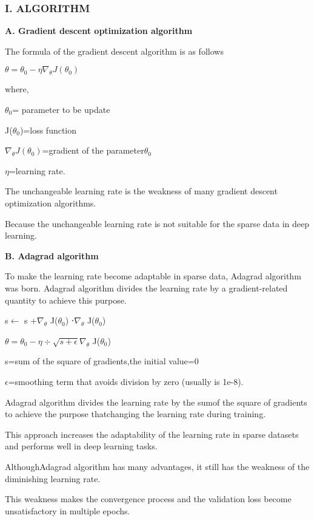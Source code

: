 \documentclass{beamer}
\begin{document}
\begin{frame}
\frametitle{I. ALGORITHM}

\textbf{A. Gradient descent optimization algorithm}

The formula of the gradient descent algorithm is as
follows 


$\theta=\theta_0-\eta \nabla_\theta J(\theta_0)$


where,


$ \theta_0 $= parameter to be update


J($\theta_0 $)=loss function 


$ \nabla_\theta J (\theta_0) $=gradient of the parameter$ \theta_0$


$\eta$=learning rate.


The unchangeable learning rate is the weakness of many gradient descent optimization algorithms.


Because the unchangeable learning rate is not suitable for the sparse data in deep learning.
\end{frame}
\begin{frame}
\textbf{B. Adagrad algorithm}

To make the learning rate become adaptable in sparse data, Adagrad algorithm was born. Adagrad algorithm divides the learning rate by a gradient-related quantity to
achieve this purpose.

s$\leftarrow $ s +$ \nabla_\theta$ J($\theta_0 $) ⋅$\nabla_\theta $ J($\theta_0 $)

$\theta=\theta_0-\eta\div\sqrt{s+\epsilon}\nabla_\theta $ J($\theta_0 $)


s=sum of the square of gradients,the initial value=0 

$\epsilon$=smoothing term that avoids division by zero (usually is 1e-8).

\end{frame}
\begin{frame}
Adagrad algorithm divides the learning rate by the sumof the square of gradients to achieve the purpose thatchanging the learning rate during training.


This approach increases the adaptability of the learning rate in sparse datasets and performs well in deep learning tasks.


AlthoughAdagrad algorithm has many advantages, it still has the weakness of the diminishing learning rate. 


This weakness makes the convergence process and the validation loss become unsatisfactory in multiple epochs.
\end{frame}
\end{document}
